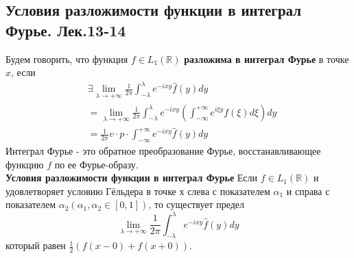 \documentclass{article}
\begin{document}
\subsection{Условия разложимости функции в интеграл Фурье. Лек.13-14}
	Будем говорить, что функция $ f \in L_{1}(\mathbb{R}) $ \textbf{разложима в интеграл Фурье} в точке $ x$, если
	\begin{equation}
	\begin{aligned}
	&\exists \lim _{\lambda \rightarrow+\infty} \frac{1}{2 \pi} \int_{-\lambda}^{\lambda} e^{-i x y} \widehat{f}(y) d y\\
	&=\lim _{\lambda \rightarrow+\infty} \frac{1}{2 \pi} \int_{-\lambda}^{\lambda} e^{-i x y}\left(\int_{-\infty}^{+\infty} e^{i \xi y} f(\xi) d \xi\right) d y\\
	&=\frac{1}{2 \pi} v \cdot p \cdot \int_{-\infty}^{+\infty} e^{-i x y} \hat{f}(y) d y
	\end{aligned}
	\end{equation}
	Интеграл Фурье - это обратное преобразование Фурье, восстанавливающее функцию $f$ по ее Фурье-образу.\\
	\textbf{Условия разложимости функции в интеграл Фурье} Если $ f \in L_{1}(\mathbb{R}) $ и удовлетворяет условию Гёльдера в точке $х$ слева с показателем $ \alpha_{1} $ и справа с показателем $ \alpha_{2}\left(\alpha_{1}, \alpha_{2} \in[0,1]\right)$, то существует предел
	\begin{equation}
	\lim _{\lambda \rightarrow+\infty} \frac{1}{2 \pi} \int_{-\lambda}^{\lambda} e^{-i x y} \hat{f}(y) d y
	\end{equation}	
	который равен $\frac{1}{2}(f(x-0)+f(x+0))$.\\ 
		
\end{document}
